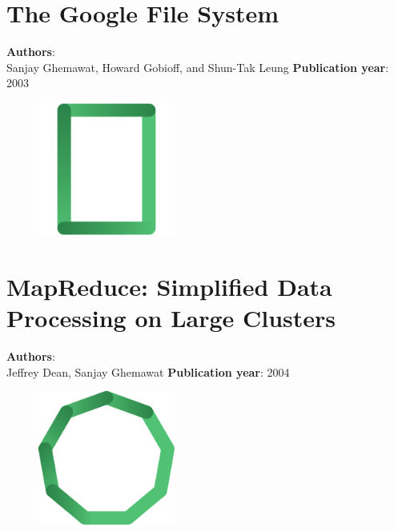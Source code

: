 \documentclass[11pt,fleqn]{book} %
\begin{document}
\chapter{The Google File System}
\vspace*{-7mm}
\Large \textbf{Authors}: \\
Sanjay Ghemawat, Howard Gobioff, and Shun-Tak Leung
\newline\newline
\textbf{Publication year}: 2003
\begin{figure}[b]
    \centering
    \includegraphics[width=0.4\textwidth]{distributed-systems-rectangle.pdf}
\end{figure}


\chapter{MapReduce: Simplified Data Processing on Large Clusters}
\vspace*{-7mm}
\Large \textbf{Authors}: \\
Jeffrey Dean, Sanjay Ghemawat
\newline\newline
\textbf{Publication year}: 2004
\begin{figure}[b]
    \centering
    \includegraphics[width=0.4\textwidth]{distributed-systems.pdf}
\end{figure}

\end{document}
